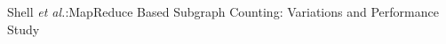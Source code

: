 \documentclass[10pt,journal,compsoc]{IEEEtran}
\begin{document}
%
{Shell \MakeLowercase{\textit{et al.}}:MapReduce Based Subgraph Counting:
Variations and Performance Study}

% 






\end{document}
